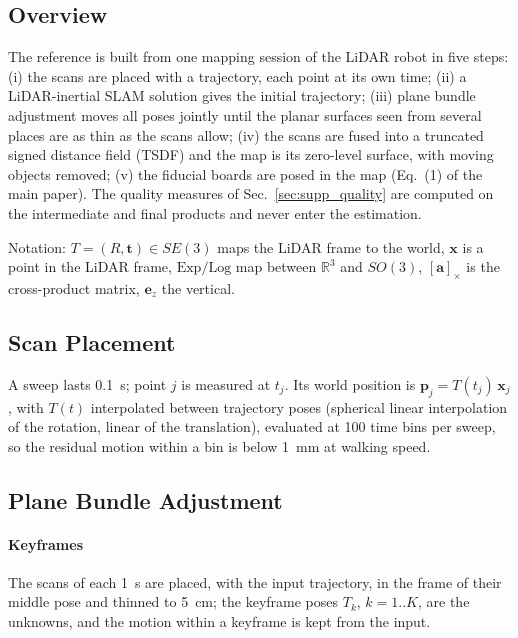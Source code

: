 
\subsection{Overview}
\label{sec:supp_refmap}
The reference is built from one mapping session of the LiDAR robot in five
steps: (i) the scans are placed with a trajectory, each point at its own
time; (ii) a LiDAR-inertial SLAM solution \cite{glim} gives the initial
trajectory; (iii) plane bundle adjustment moves all poses jointly until the
planar surfaces seen from several places are as thin as the scans allow;
(iv) the scans are fused into a truncated signed distance field (TSDF) and
the map is its zero-level surface, with moving objects removed; (v) the
fiducial boards are posed in the map (Eq.~(1) of the main paper). The
quality measures of Sec.~\ref{sec:supp_quality} are computed on the
intermediate and final products and never enter the estimation.

Notation: $T=(R,\mathbf t)\in SE(3)$ maps the LiDAR frame to the world,
$\mathbf x$ is a point in the LiDAR frame, $\mathrm{Exp}/\mathrm{Log}$ map
between $\mathbb R^3$ and $SO(3)$, $[\mathbf a]_\times$ is the
cross-product matrix, $\mathbf e_z$ the vertical.

\subsection{Scan Placement}
A sweep lasts \SI{0.1}{\second}; point $j$ is measured at $t_j$. Its world
position is $\mathbf p_j = T(t_j)\,\mathbf x_j$, with $T(t)$ interpolated
between trajectory poses (spherical linear interpolation of the rotation,
linear of the translation), evaluated at 100 time bins per sweep, so the
residual motion within a bin is below \SI{1}{\milli\metre} at walking speed.

\subsection{Plane Bundle Adjustment}
\paragraph{Keyframes} The scans of each \SI{1}{\second} are placed, with the
input trajectory, in the frame of their middle pose and thinned to
\SI{5}{\centi\metre}; the keyframe poses $T_k$, $k=1..K$, are the
unknowns, and the motion within a keyframe is kept from the input.

